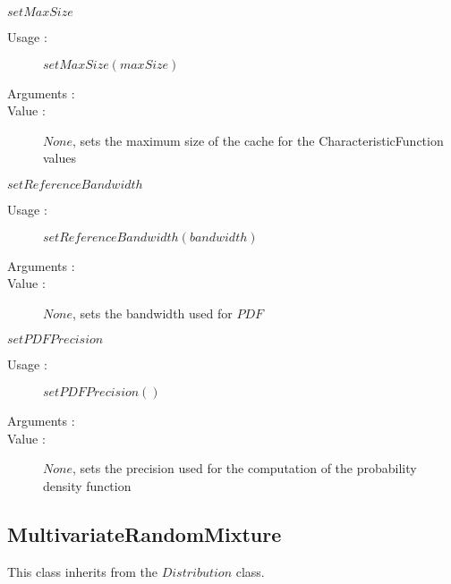 \begin{description}
\begin{description}
\begin{description}
  \item $setMaxSize$
    \begin{description}
    \item[Usage :]  $setMaxSize(maxSize)$
    \item[Arguments :]  \strut
    \item[Value :] $None$, sets the maximum size of the cache for the CharacteristicFunction values
    \end{description}

  \item $setReferenceBandwidth$
    \begin{description}
    \item[Usage :]  $setReferenceBandwidth(bandwidth)$
    \item[Arguments :] \strut
    \item[Value :] $None$, sets the bandwidth used for $PDF$
    \end{description}

  \item $setPDFPrecision$
    \begin{description}
    \item[Usage :]  $setPDFPrecision()$
    \item[Arguments :]  \strut
    \item[Value :] $None$, sets the precision used for the computation of the probability density function
    \end{description}

  \end{description}

\end{description}

\subsection{MultivariateRandomMixture}
This class inherits from the $Distribution$ class.


\end{description}

